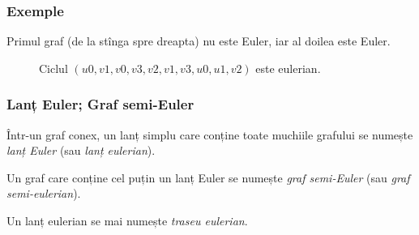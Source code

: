\begin{frame}
  \frametitle{Exemple}

\begin{figure}
\centering%
\end{figure}
\pause

Primul graf (de la stînga spre dreapta) nu este Euler, iar al doilea este Euler. 
\pause

\begin{figure}
\centering%
\caption{Ciclul $(u0,v1,v0,v3,v2,v1,v3,u0,u1,v2)$ este eulerian.}
\end{figure}
 
\end{frame}

\begin{frame}
  \frametitle{Lanț Euler; Graf semi-Euler}

Într-un graf conex, un lanț simplu care conține toate muchiile grafului se numește \emph{lanț Euler} (sau \emph{lanț eulerian}).
\pause

Un graf care conține cel puțin un lanț Euler se numește \emph{graf semi-Euler} (sau \emph{graf semi-eulerian}).
\pause

Un lanț eulerian se mai numește \emph{traseu eulerian}.

\end{frame}

